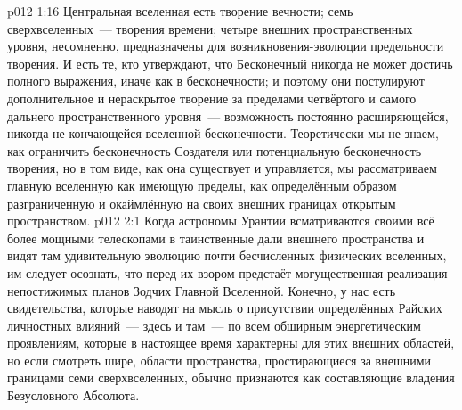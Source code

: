 \vs p012 1:16 Центральная вселенная есть творение вечности; семь сверхвселенных~--- творения времени; четыре внешних пространственных уровня, несомненно, предназначены для возникновения\hyp{}эволюции предельности творения. И есть те, кто утверждают, что Бесконечный никогда не может достичь полного выражения, иначе как в бесконечности; и поэтому они постулируют дополнительное и нераскрытое творение за пределами четвёртого и самого дальнего пространственного уровня~--- возможность постоянно расширяющейся, никогда не кончающейся вселенной бесконечности. Теоретически мы не знаем, как ограничить бесконечность Создателя или потенциальную бесконечность творения, но в том виде, как она существует и управляется, мы рассматриваем главную вселенную как имеющую пределы, как определённым образом разграниченную и окаймлённую на своих внешних границах открытым пространством.
\vs p012 2:1 Когда астрономы Урантии всматриваются своими всё более мощными телескопами в таинственные дали внешнего пространства и видят там удивительную эволюцию почти бесчисленных физических вселенных, им следует осознать, что перед их взором предстаёт могущественная реализация непостижимых планов Зодчих Главной Вселенной. Конечно, у нас есть свидетельства, которые наводят на мысль о присутствии определённых Райских личностных влияний~--- здесь и там~--- по всем обширным энергетическим проявлениям, которые в настоящее время характерны для этих внешних областей, но если смотреть шире, области пространства, простирающиеся за внешними границами семи сверхвселенных, обычно признаются как составляющие владения Безусловного Абсолюта.
